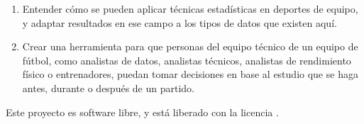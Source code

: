 \begin{enumerate}
    \item Entender cómo se pueden aplicar técnicas estadísticas en deportes de equipo, 
    y adaptar resultados en ese campo a los tipos de datos que existen aquí.
    \item Crear una herramienta para que personas del equipo 
    técnico de un equipo de fútbol, como analistas de datos, analistas técnicos, analistas de rendimiento 
    físico o entrenadores, puedan tomar decisiones en base al estudio que se haga antes, durante 
    o después de un partido. 
\end{enumerate}

Este proyecto es software libre, y está liberado con la licencia \cite{gplv3}.
